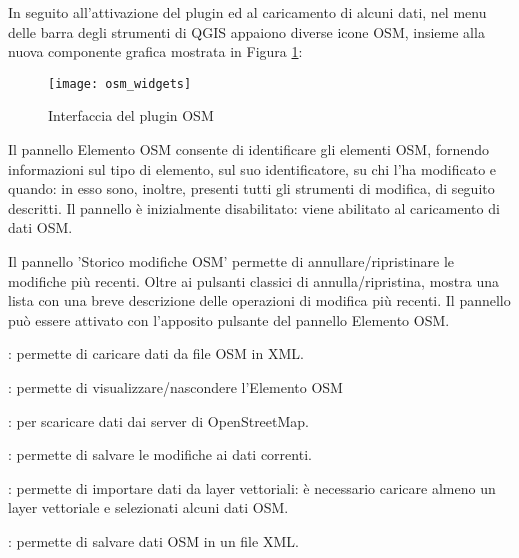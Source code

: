 In seguito all'attivazione del plugin ed al caricamento di alcuni dati, nel menu delle barra degli strumenti 
di QGIS appaiono diverse icone OSM, insieme alla nuova componente grafica mostrata in Figura \ref{fig:osmwidget}:

\begin{figure}[ht]
   \centering
   \texttt{[image: osm\_widgets]}
   \caption{Interfaccia del plugin OSM \wincaption}\label{fig:osmwidget}
\end{figure}


Il pannello Elemento OSM consente di identificare gli elementi OSM, fornendo informazioni sul tipo di 
elemento, sul suo identificatore, su chi l'ha modificato e quando: in esso sono, inoltre, presenti 
tutti gli strumenti di modifica, di seguito descritti. 
Il pannello è inizialmente disabilitato: viene abilitato al caricamento di dati OSM. 


Il pannello 'Storico modifiche OSM' permette di annullare/ripristinare le modifiche più recenti. Oltre ai pulsanti classici 
di annulla/ripristina, mostra una lista con una breve descrizione delle operazioni di modifica più recenti.
Il pannello può essere attivato con l'apposito pulsante del pannello Elemento OSM.


\begin{description}
\item {}: permette di caricare dati da file OSM in XML.
\item {}: permette di visualizzare/nascondere 
l'Elemento OSM 
\item {}: per scaricare dati dai server di OpenStreetMap.
\item {}: permette di salvare le modifiche ai dati correnti.
\item {}: permette di importare dati da layer vettoriali: è necessario 
caricare almeno un layer vettoriale e selezionati alcuni dati OSM.
\item {}: permette di salvare dati OSM in un file XML.
\end{description}

